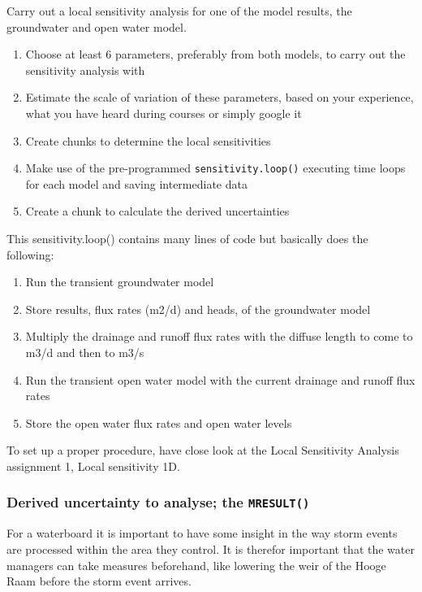 \documentclass[
]{article}
\providecommand{\tightlist}{%
  \setlength{\itemsep}{0pt}\setlength{\parskip}{0pt}}
\begin{document}
Carry out a local sensitivity analysis for one of the model results, the
groundwater and open water model.

\begin{enumerate}
\def\labelenumi{\arabic{enumi}.}
\tightlist
\item
  Choose at least 6 parameters, preferably from both models, to carry
  out the sensitivity analysis with
\item
  Estimate the scale of variation of these parameters, based on your
  experience, what you have heard during courses or simply google it
\item
  Create chunks to determine the local sensitivities
\item
  Make use of the pre-programmed \texttt{sensitivity.loop()} executing
  time loops for each model and saving intermediate data
\item
  Create a chunk to calculate the derived uncertainties
\end{enumerate}

This sensitivity.loop() contains many lines of code but basically does
the following:

\begin{enumerate}
\def\labelenumi{\arabic{enumi}.}
\tightlist
\item
  Run the transient groundwater model
\item
  Store results, flux rates (m2/d) and heads, of the groundwater model
\item
  Multiply the drainage and runoff flux rates with the diffuse length to
  come to m3/d and then to m3/s
\item
  Run the transient open water model with the current drainage and
  runoff flux rates
\item
  Store the open water flux rates and open water levels
\end{enumerate}

To set up a proper procedure, have close look at the Local Sensitivity
Analysis assignment 1, Local sensitivity 1D.

\hypertarget{derived-uncertainty-to-analyse-the-mresult}{%
\subsubsection{\texorpdfstring{Derived uncertainty to analyse; the
\texttt{MRESULT()}}{Derived uncertainty to analyse; the MRESULT()}}\label{derived-uncertainty-to-analyse-the-mresult}}

For a waterboard it is important to have some insight in the way storm
events are processed within the area they control. It is therefor
important that the water managers can take measures beforehand, like
lowering the weir of the Hooge Raam before the storm event arrives.
\end{document}
